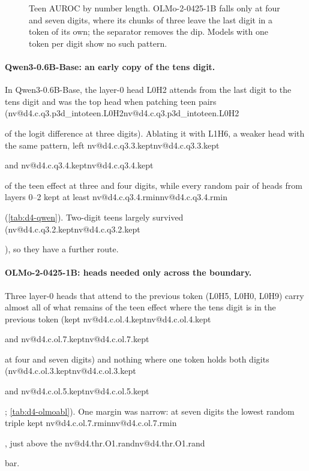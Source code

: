 \documentclass[11pt]{article}
\makeatletter
\newcommand{\nv}[1]{\ifcsname nv@#1\endcsname\csname nv@#1\endcsname\else\PackageError{numbers}{Unknown number key #1}{}\fi}
\newcommand{\hd}[2]{L#1H#2}
\newcommand{\qsix}{Qwen3-0.6B-Base}
\newcommand{\olmo}{OLMo-2-0425-1B}
\newcommand{\gm}{Gemma-4-E2B}
\makeatother
\begin{document}
\begin{figure}[t]
\centering
{}
\caption{Teen AUROC by number length. \olmo{} falls only at four and seven digits, where its chunks of three leave the last digit in a token of its own; the separator removes the dip. Models with one token per digit show no such pattern.}
\label{fig:auroc}
\end{figure}

\paragraph{\qsix{}: an early copy of the tens digit.} In \qsix{}, the layer-0 head \hd{0}{2} attends from the last digit to the tens digit and was the top head when patching teen pairs (\nv{d4.c.q3.p3d_intoteen.L0H2} of the logit difference at three digits). Ablating it with \hd{1}{6}, a weaker head with the same pattern, left \nv{d4.c.q3.3.kept} and \nv{d4.c.q3.4.kept} of the teen effect at three and four digits, while every random pair of heads from layers 0--2 kept at least \nv{d4.c.q3.4.rmin} (\cref{tab:d4-qwen}). Two-digit teens largely survived (\nv{d4.c.q3.2.kept}), so they have a further route.

\paragraph{\olmo{}: heads needed only across the boundary.} Three layer-0 heads that attend to the previous token (\hd{0}{5}, \hd{0}{0}, \hd{0}{9}) carry almost all of what remains of the teen effect where the tens digit is in the previous token (kept \nv{d4.c.ol.4.kept} and \nv{d4.c.ol.7.kept} at four and seven digits) and nothing where one token holds both digits (\nv{d4.c.ol.3.kept} and \nv{d4.c.ol.5.kept}; \cref{tab:d4-olmoabl}). One margin was narrow: at seven digits the lowest random triple kept \nv{d4.c.ol.7.rmin}, just above the \nv{d4.thr.O1.rand} bar.
\end{document}
